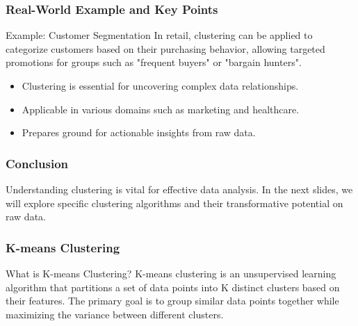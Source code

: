 \documentclass[aspectratio=169]{beamer}
\begin{document}
\begin{frame}[fragile]
    \frametitle{Real-World Example and Key Points}
    \begin{block}{Example: Customer Segmentation}
        In retail, clustering can be applied to categorize customers based on their purchasing behavior, allowing targeted promotions for groups such as "frequent buyers" or "bargain hunters".
    \end{block}

    \begin{itemize}
        \item Clustering is essential for uncovering complex data relationships.
        \item Applicable in various domains such as marketing and healthcare.
        \item Prepares ground for actionable insights from raw data.
    \end{itemize}
\end{frame}

\begin{frame}[fragile]
    \frametitle{Conclusion}
    Understanding clustering is vital for effective data analysis. 
    In the next slides, we will explore specific clustering algorithms and their transformative potential on raw data.
\end{frame}

\begin{frame}[fragile]
    \frametitle{K-means Clustering}
    \begin{block}{What is K-means Clustering?}
        K-means clustering is an unsupervised learning algorithm that partitions a set of data points into K distinct clusters based on their features. The primary goal is to group similar data points together while maximizing the variance between different clusters.
    \end{block}
\end{frame}
\end{document}

